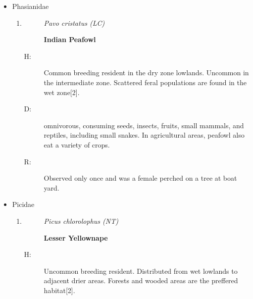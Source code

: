 \begin{itemize}
\begin{enumerate}
\begin{description}
\end{description}%
\begin{description}%
\item[H: ]%
Very common breeding resident mainly from lowlands to lower hills. Present in higher hills but less common. Lakes, tanks, marshes, paddyfields, rivers, streams and lagoons are preferred habitats{[}2{]}.%
\item[D: ]%
Primarily consume fish, occasionally on crustaceans and amphibians. They engage in diving to capture their prey and resurface to swallow it.%
\item[R: ]%
boat yard and the surrounding areas of Bolgoda lake.%
\end{description}%
\end{enumerate}%
\item%
Phasianidae%
\begin{enumerate}%
\item%
\begin{description}%
\item[]%
\textit{Pavo cristatus (LC)}%
\item[]%
\textbf{Indian Peafowl}%
\end{description}%
\begin{description}%
\item[H: ]%
Common breeding resident in the dry zone lowlands. Uncommon in the intermediate zone. Scattered feral populations are found in the wet zone{[}2{]}.%
\item[D: ]%
omnivorous, consuming seeds, insects, fruits, small mammals, and reptiles, including small snakes. In agricultural areas, peafowl also eat a variety of crops.%
\item[R: ]%
Observed only once and was a female perched on a tree at boat yard.%
\end{description}%
\end{enumerate}%
\item%
Picidae%
\begin{enumerate}%
\item%
\begin{description}%
\item[]%
\textit{Picus chlorolophus (NT)}%
\item[]%
\textbf{Lesser Yellownape}%
\end{description}%
\begin{description}%
\item[H: ]%
Uncommon breeding resident. Distributed from wet lowlands to adjacent drier areas. Forests and wooded areas are the preffered habitat{[}2{]}.%

\end{description}
\end{enumerate}
\end{itemize}
